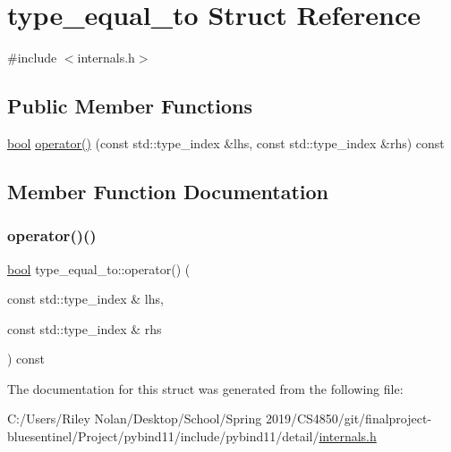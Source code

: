 \hypertarget{structtype__equal__to}{}\section{type\+\_\+equal\+\_\+to Struct Reference}
\label{structtype__equal__to}


{\ttfamily \#include $<$internals.\+h$>$}

\subsection*{Public Member Functions}
\begin{DoxyCompactItemize}
\item 
\mbox{\hyperlink{asdl_8h_af6a258d8f3ee5206d682d799316314b1}{bool}} \mbox{\hyperlink{structtype__equal__to_acb022d369982d994b59bc6ad0755cf8f}{operator()}} (const std\+::type\+\_\+index \&lhs, const std\+::type\+\_\+index \&rhs) const
\end{DoxyCompactItemize}


\subsection{Member Function Documentation}
\mbox{\label{structtype__equal__to_acb022d369982d994b59bc6ad0755cf8f}} 
\subsubsection{\texorpdfstring{operator()()}{operator()()}}
{\footnotesize\ttfamily \mbox{\hyperlink{asdl_8h_af6a258d8f3ee5206d682d799316314b1}{bool}} type\+\_\+equal\+\_\+to\+::operator() (\begin{DoxyParamCaption}\item[{const std\+::type\+\_\+index \&}]{lhs,  }\item[{const std\+::type\+\_\+index \&}]{rhs }\end{DoxyParamCaption}) const\hspace{0.3cm}{\ttfamily [inline]}}



The documentation for this struct was generated from the following file\+:\begin{DoxyCompactItemize}
\item 
C\+:/\+Users/\+Riley Nolan/\+Desktop/\+School/\+Spring 2019/\+C\+S4850/git/finalproject-\/bluesentinel/\+Project/pybind11/include/pybind11/detail/\mbox{\hyperlink{internals_8h}{internals.\+h}}\end{DoxyCompactItemize}
